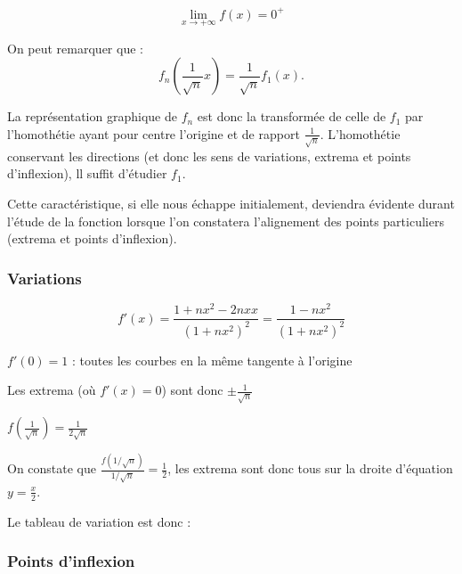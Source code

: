\documentclass{report}
\begin{document}
\begin{displaymath}
	\lim_{x \rightarrow +\infty} f(x) = 0^{+}
\end{displaymath}

On peut remarquer que :
\begin{displaymath}
	f_n\left(\frac{1}{\sqrt{n}} x \right) = \frac{1}{\sqrt{n}} f_1(x).
\end{displaymath}

La représentation graphique de $f_n$ est donc la transformée de celle de $f_1$
par l'homothétie ayant pour centre l'origine et de rapport $\frac{1}{\sqrt{n}}$.
L'homothétie conservant les directions (et donc les sens de variations, extrema et
points d'inflexion), ll suffit d'étudier $f_1$.

Cette caractéristique, si elle nous échappe initialement, deviendra évidente durant
l'étude de la fonction lorsque l'on constatera l'alignement des points particuliers
(extrema et points d'inflexion).

\subsubsection*{Variations}

\begin{displaymath}
	f'(x) = \frac{1+nx^2-2nxx}{(1+nx^2)^2}=\frac{1-nx^2}{(1+nx^2)^2}
\end{displaymath}

$f'(0) = 1$ : toutes les courbes en la même tangente à l'origine

Les extrema (où $f'(x)=0$) sont donc $\pm\frac{1}{\sqrt{n}}$

$f(\frac{1}{\sqrt{n}}) = \frac{1}{2\sqrt{n}}$

On constate que $\frac{f(1/\sqrt{n})}{1/\sqrt{n}} = \frac{1}{2}$, les extrema sont donc tous sur la droite
d'équation $y=\frac{x}{2}$.

Le tableau de variation est donc :


\subsubsection*{Points d'inflexion}
\end{document}
